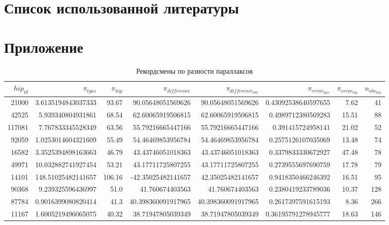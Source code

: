 \documentclass[14pt]{article} %
\begin{document}
\newpage
\section{Список использованной литературы}\label{conclusionlit}
%
%
\printbibliography[type=online,title={Сайты}]
\printbibliography[type=book,title={Статьи:}]


\appendix

\section*{Приложение}

\newpage
\begin{landscape}
\begin{spacing}{1.0}
\begin{table}[h]
\caption{Рекордсмены по разности параллаксов}
\label{tabular:75_25}
\begin{tabular}{|r|r|r|r|r|r|r|r|}
\hline 	
$hip_{id}$ &$\pi_{tgas}$ &$\pi_{hip}$ &$\pi_{difference}$ &$\pi_{difference_{abs}}$ &$\pi_{error_{tgas}}$ &$\pi_{error_{hip}}$ &$n_{obs_{hip}}$\\
\hline 
21000&3.6135194843037333&93.67&90.05648051569626&90.05648051569626&0.43092538640597655&7.62&41\\
42525&5.939340804931861&68.54&62.60065919506815&62.60065919506815&0.4989712380569283&15.51&88\\
117081&7.767833345528349&63.56&55.79216665447166&55.79216665447166&0.391415724958141&21.02&52\\
92059&1.0253014604321609&55.49&54.46469853956784&54.46469853956784&0.2575126107035069&13.48&74\\
16582&3.3525394898163663&46.79&43.43746051018363&43.43746051018363&0.3379833330672927&47.48&78\\
49971&10.032882741927454&53.21&43.17711725807255&43.17711725807255&0.2739555697690759&17.78&79\\
14101&148.51025482141657&106.16&-42.35025482141657&42.35025482141657&0.9418350466246392&16.51&95\\
90368&9.239325596436997&51.0&41.760674403563&41.760674403563&0.2380419233789036&10.37&128\\
87784&0.9016399080820414&41.3&40.398360091917965&40.398360091917965&0.2617397591615193&8.36&266\\
11167&1.6005219496065075&40.32&38.71947805039349&38.71947805039349&0.36195791278945777&18.63&146\\

\end{tabular}
\end{table}
\end{spacing}
\end{landscape}
\end{document}
